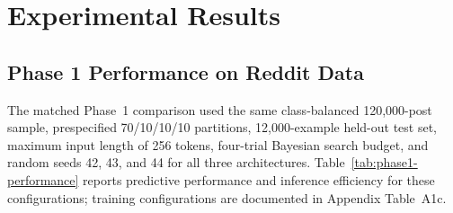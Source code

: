 \documentclass{ieeeaccess}
\begin{document}
\section{Experimental Results}
\subsection{Phase 1 Performance on Reddit Data}

The matched Phase~1 comparison used the same class-balanced 120,000-post sample, prespecified 70/10/10/10 partitions, 12,000-example held-out test set, maximum input length of 256 tokens, four-trial Bayesian search budget, and random seeds 42, 43, and 44 for all three architectures. Table~\ref{tab:phase1-performance} reports predictive performance and inference efficiency for these configurations; training configurations are documented in Appendix Table~A1c.
\end{document}
